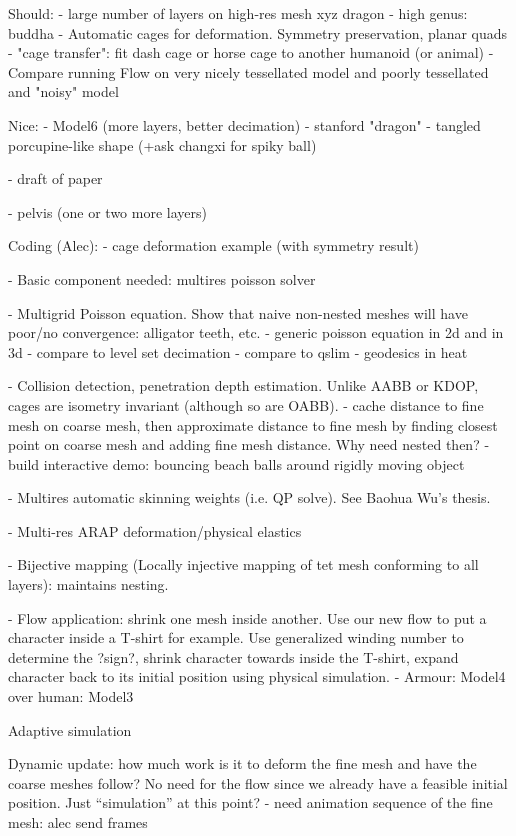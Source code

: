 Should:
  - large number of layers on high-res mesh xyz dragon
  - high genus: buddha
  - Automatic cages for deformation. Symmetry preservation, planar quads
    - "cage transfer": fit dash cage or horse cage to another humanoid (or
      animal)
  - Compare running Flow on very nicely tessellated model and poorly
  tessellated and "noisy" model

Nice:
  - Model6 (more layers, better decimation)
  - stanford "dragon"
  - tangled porcupine-like shape (+ask changxi for spiky ball)

- draft of paper

- pelvis (one or two more layers)



Coding (Alec):
 - cage deformation example (with symmetry result)

 - Basic component needed: multires poisson solver

 - Multigrid Poisson equation. Show that naive non-nested meshes will have
   poor/no convergence: alligator teeth, etc.
     - generic poisson equation in 2d and in 3d
       - compare to level set decimation
       - compare to qslim
     - geodesics in heat 

 - Collision detection, penetration depth estimation. Unlike AABB or KDOP, cages
   are isometry invariant (although so are OABB).
     - cache distance to fine mesh on coarse mesh, then approximate distance to
       fine mesh by finding closest point on coarse mesh and adding fine mesh
       distance. Why need nested then?
     - build interactive demo: bouncing beach balls around rigidly moving object
   
 - Multires automatic skinning weights (i.e. QP solve). See Baohua Wu's thesis.
   
 - Multi-res ARAP deformation/physical elastics

 - Bijective mapping (Locally injective mapping of tet mesh conforming to all
   layers): maintains nesting.

 - Flow application: shrink one mesh inside another. Use our new flow to put a 
  character inside a T-shirt for example. Use generalized winding number to 
  determine the ?sign?, shrink character towards inside the T-shirt, 
  expand character back to its initial position using physical simulation. 
    - Armour: Model4 over human: Model3

Adaptive simulation \cite{Debunne:2001:DRD}

Dynamic update: how much work is it to deform the fine mesh and have the coarse
meshes follow? No need for the flow since we already have a feasible initial
position. Just ``simulation'' at this point?
  - need animation sequence of the fine mesh: alec send frames


